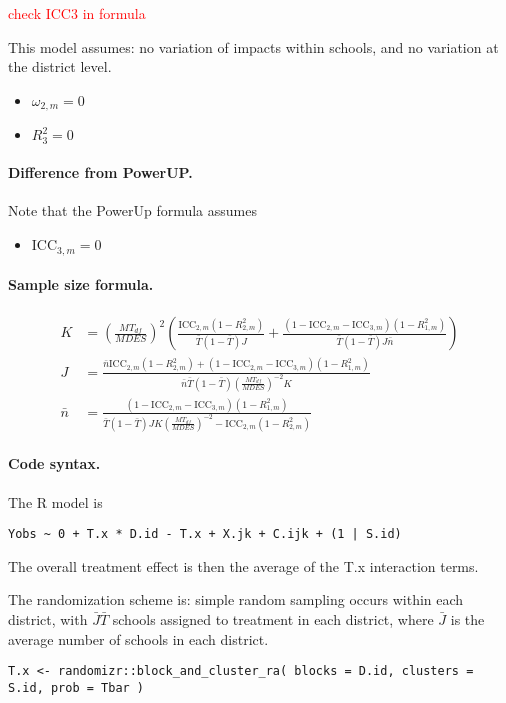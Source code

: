 \documentclass[12pt]{article}
\begin{document}
\textcolor{red}{check ICC3 in formula}

This model assumes: no variation of impacts within schools, and no variation at the district level.
\begin{itemize}
\item $\omega_{2,m} = 0$
\item $R^2_3 = 0$
\end{itemize}

\paragraph{Difference from PowerUP.}

Note that the PowerUp formula assumes
\begin{itemize}
\item $\text{ICC}_{3,m} = 0$
\end{itemize}

\paragraph{Sample size formula.} 
\begin{align}
K &= \left(\frac{MT_{df}}{MDES}\right)^2 \left( \frac{\text{ICC}_{2,m} (1-R_{2,m}^2)}{\bar{T}(1 - \bar{T}) J} + \frac{(1-\text{ICC}_{2,m} - \text{ICC}_{3,m})(1-R^2_{1,m})}{\bar{T}(1 - \bar{T}) J \bar{n}} \right)\\
J &= \frac{\bar{n}\text{ICC}_{2,m} (1-R_{2,m}^2) + (1-\text{ICC}_{2,m} - \text{ICC}_{3,m})(1-R^2_{1,m})}{\bar{n} \bar{T}(1 - \bar{T})\left(\frac{MT_{df}}{MDES}\right)^{-2} K } \\
\bar{n} &= \frac{(1-\text{ICC}_{2,m} - \text{ICC}_{3,m})(1-R^2_{1,m})}{\bar{T}(1 - \bar{T})J K \left(\frac{MT_{df}}{MDES}\right)^{-2} -  \text{ICC}_{2,m} (1-R_{2,m}^2)}
\end{align}


\paragraph{Code syntax.}
The R model is
\begin{verbatim}
Yobs ~ 0 + T.x * D.id - T.x + X.jk + C.ijk + (1 | S.id)
\end{verbatim}
The overall treatment effect is then the average of the T.x interaction terms.

The randomization scheme is: simple random sampling occurs within each district, with $\bar{J} \bar{T}$ schools assigned to treatment in each district, where $\bar{J}$ is the average number of schools in each district.
\begin{verbatim}
T.x <- randomizr::block_and_cluster_ra( blocks = D.id, clusters = S.id, prob = Tbar )
\end{verbatim}
\end{document}
